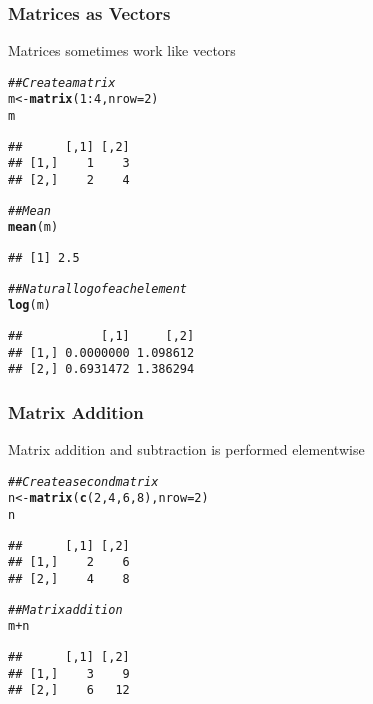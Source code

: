 \documentclass{beamer}\usepackage[]{graphicx}\usepackage[]{color}
\makeatletter
\newcommand{\hlnum}[1]{\textcolor[rgb]{0.686,0.059,0.569}{#1}}%
\newcommand{\hlcom}[1]{\textcolor[rgb]{0.678,0.584,0.686}{\textit{#1}}}%
\newcommand{\hlopt}[1]{\textcolor[rgb]{0,0,0}{#1}}%
\newcommand{\hlstd}[1]{\textcolor[rgb]{0.345,0.345,0.345}{#1}}%
\newcommand{\hlkwb}[1]{\textcolor[rgb]{0.69,0.353,0.396}{#1}}%
\newcommand{\hlkwc}[1]{\textcolor[rgb]{0.333,0.667,0.333}{#1}}%
\newcommand{\hlkwd}[1]{\textcolor[rgb]{0.737,0.353,0.396}{\textbf{#1}}}%
\newenvironment{kframe}{%
 \def\at@end@of@kframe{}%
 \ifinner\ifhmode%
  \def\at@end@of@kframe{\end{minipage}}%
  \begin{minipage}{\columnwidth}%
 \fi\fi%
 \def\FrameCommand##1{\hskip\@totalleftmargin \hskip-\fboxsep
 \colorbox{shadecolor}{##1}\hskip-\fboxsep
     \hskip-\linewidth \hskip-\@totalleftmargin \hskip\columnwidth}%
 \MakeFramed {\advance\hsize-\width
   \@totalleftmargin\z@ \linewidth\hsize
   \@setminipage}}%
 {\par\unskip\endMakeFramed%
 \at@end@of@kframe}
\newenvironment{knitrout}{}{} %
\makeatother
\begin{document}
\begin{frame}[fragile]\frametitle{Matrices as Vectors}
    Matrices sometimes work like vectors
\begin{knitrout}\footnotesize
{}\color{fgcolor}\begin{kframe}
\begin{alltt}
\hlcom{## Create a matrix}
\hlstd{m} \hlkwb{<-} \hlkwd{matrix}\hlstd{(}\hlnum{1}\hlopt{:}\hlnum{4}\hlstd{,} \hlkwc{nrow} \hlstd{=} \hlnum{2}\hlstd{)}
\hlstd{m}
\end{alltt}
\begin{verbatim}
##      [,1] [,2]
## [1,]    1    3
## [2,]    2    4
\end{verbatim}
\begin{alltt}
\hlcom{## Mean}
\hlkwd{mean}\hlstd{(m)}
\end{alltt}
\begin{verbatim}
## [1] 2.5
\end{verbatim}
\begin{alltt}
\hlcom{## Natural log of each element}
\hlkwd{log}\hlstd{(m)}
\end{alltt}
\begin{verbatim}
##           [,1]     [,2]
## [1,] 0.0000000 1.098612
## [2,] 0.6931472 1.386294
\end{verbatim}
\end{kframe}
\end{knitrout}
\end{frame}

\begin{frame}[fragile]\frametitle{Matrix Addition}
    Matrix addition and subtraction is performed elementwise
\begin{knitrout}\footnotesize
{}\color{fgcolor}\begin{kframe}
\begin{alltt}
\hlcom{## Create a second matrix}
\hlstd{n} \hlkwb{<-} \hlkwd{matrix}\hlstd{(}\hlkwd{c}\hlstd{(}\hlnum{2}\hlstd{,} \hlnum{4}\hlstd{,} \hlnum{6}\hlstd{,} \hlnum{8}\hlstd{),} \hlkwc{nrow} \hlstd{=} \hlnum{2}\hlstd{)}
\hlstd{n}
\end{alltt}
\begin{verbatim}
##      [,1] [,2]
## [1,]    2    6
## [2,]    4    8
\end{verbatim}
\begin{alltt}
\hlcom{## Matrix addition}
\hlstd{m} \hlopt{+} \hlstd{n}
\end{alltt}
\begin{verbatim}
##      [,1] [,2]
## [1,]    3    9
## [2,]    6   12
\end{verbatim}
\end{kframe}
\end{knitrout}
\end{frame}
\end{document}
